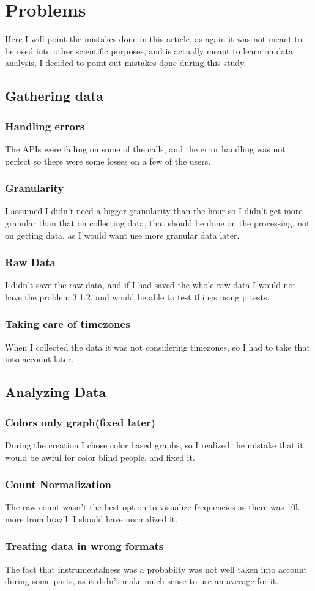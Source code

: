 \documentclass[a4paper]{article}
\begin{document}
\section{Problems}
Here I will point the mistakes done in this article, as again it was not meant to be used into other scientific purposes, and is actually meant to learn on data analysis, I decided to point out mistakes done during this study.
\subsection{Gathering data}
\subsubsection{Handling errors}
The APIs were failing on some of the calls, and the error handling was not perfect so there were some losses on a few of the users. 
\subsubsection{Granularity}
I assumed I didn't need a bigger granularity than the hour so I didn't get more granular than that on collecting data, that should be done on the processing, not on getting data, as I would want use more granular data later.
\subsubsection{Raw Data}
I didn't save the raw data, and if I had saved the whole raw data I would not have the problem 3.1.2, and would be able to test things using p tests.
\subsubsection{Taking care of timezones}
When I collected the data it was not considering timezones, so I had to take that into account later.
\subsection{Analyzing Data}
\subsubsection{Colors only graph(fixed later)}
During the creation I chose color based graphs, so I realized the mistake that it would be awful for color blind people, and fixed it.
\subsubsection{Count Normalization}
The raw count wasn't the best option to visualize frequencies as there was 10k more from brazil. I should have normalized it.
\subsubsection{Treating data in wrong formats}
The fact that instrumentalness was a probabilty was not well taken into account during some parts, as it didn't make much sense to use an average for it.
\end{document}
